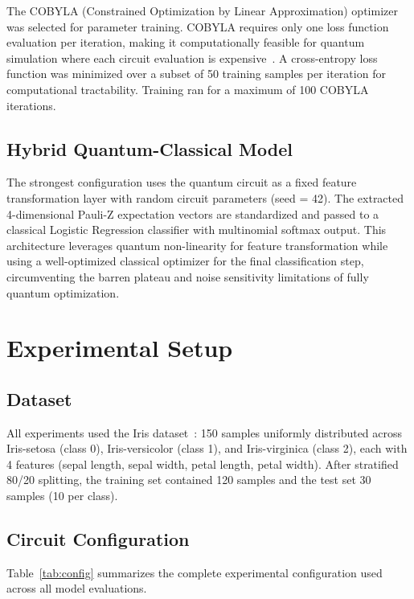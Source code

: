 \documentclass[conference]{IEEEtran}
\begin{document}
The COBYLA (Constrained Optimization by Linear Approximation) optimizer was selected for parameter training. COBYLA requires only one loss function evaluation per iteration, making it computationally feasible for quantum simulation where each circuit evaluation is expensive~\cite{yin2025}. A cross-entropy loss function was minimized over a subset of 50 training samples per iteration for computational tractability. Training ran for a maximum of 100 COBYLA iterations.

\subsection{Hybrid Quantum-Classical Model}

The strongest configuration uses the quantum circuit as a fixed feature transformation layer with random circuit parameters (seed = 42). The extracted 4-dimensional Pauli-Z expectation vectors are standardized and passed to a classical Logistic Regression classifier with multinomial softmax output. This architecture leverages quantum non-linearity for feature transformation while using a well-optimized classical optimizer for the final classification step, circumventing the barren plateau and noise sensitivity limitations of fully quantum optimization.

\section{Experimental Setup}

\subsection{Dataset}

All experiments used the Iris dataset~\cite{pedregosa2011}: 150 samples uniformly distributed across Iris-setosa (class 0), Iris-versicolor (class 1), and Iris-virginica (class 2), each with 4 features (sepal length, sepal width, petal length, petal width). After stratified 80/20 splitting, the training set contained 120 samples and the test set 30 samples (10 per class).

\subsection{Circuit Configuration}

Table~\ref{tab:config} summarizes the complete experimental configuration used across all model evaluations.
\end{document}
